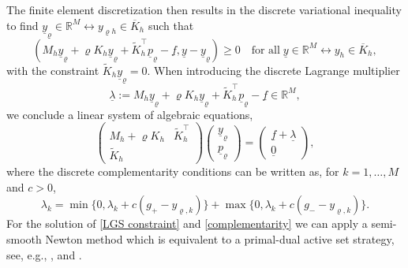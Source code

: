 \documentclass{article}
\numberwithin{equation}{section}
\begin{document}
The finite element discretization then results in the 
discrete variational inequality to find
$\underline{y}_\varrho \in {\mathbb{R}}^M \leftrightarrow
y_{\varrho h} \in \overline{K}_h$ such that
\[
  (M_h \underline{y}_\varrho + \varrho K_h \underline{y}_\varrho +
  \widetilde{K}_h^\top \underline{p}_\varrho - \underline{f} ,
  \underline{y} - \underline{y}_\varrho) \geq 0 \quad
  \mbox{for all} \; \underline{y} \in {\mathbb{R}}^M
  \leftrightarrow y_h \in \overline{K}_h,
\]
with the constraint $\widetilde{K}_h \underline{y}_\varrho = 0$.
When introducing the discrete Lagrange multiplier
\[
  \underline{\lambda} :=
  M_h \underline{y}_\varrho + \varrho K_h \underline{y}_\varrho +
  \widetilde{K}_h^\top \underline{p}_\varrho - \underline{f} \in
  {\mathbb{R}}^M,
\]
we conclude a linear system of algebraic equations,
\begin{equation}\label{LGS constraint}
  \left(
    \begin{array}{cc}
      M_h + \varrho K_h & \widetilde{K}_h^\top \\[1mm]
      \widetilde{K}_h &
    \end{array}
  \right)
  \left(
    \begin{array}{c}
      \underline{y}_\varrho \\[1mm]
      \underline{p}_\varrho
    \end{array}
  \right)
  =
  \left(
    \begin{array}{c}
      \underline{f} + \underline{\lambda} \\[1mm]
      \underline{0}
    \end{array}
  \right),
\end{equation}
where the discrete complementarity conditions can be written as,
for $k=1,\ldots,M$ and $c>0$,
\begin{equation}\label{complementarity}
  \lambda_k = \min \{ 0 , \lambda_k + c (g_+-y_{\varrho,k}) \}
  + \max \{ 0, \lambda_k + c (g_--y_{\varrho,k}) \} .
\end{equation}
For the solution of \eqref{LGS constraint} and \eqref{complementarity}
we can apply a semi-smooth Newton method which is equivalent to a
primal-dual active set strategy, see, e.g.,
\cite{Hintermueller2003}, and \cite{GanglLoescherSteinbach:2025}.


%
%
\end{document}
